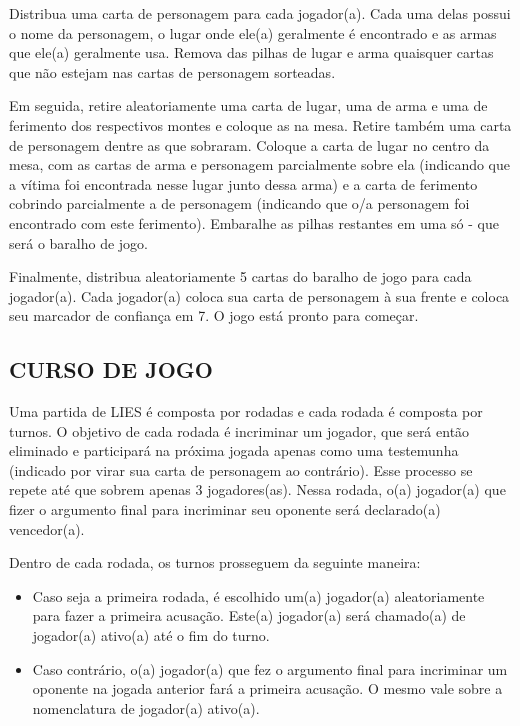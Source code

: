 \documentclass[a4paper, 11pt]{article}
\begin{document}
	Distribua uma carta de personagem para cada jogador(a). Cada uma delas possui o nome da personagem, o lugar onde ele(a) geralmente é encontrado e as armas que ele(a) geralmente usa. Remova das pilhas de lugar e arma quaisquer cartas que não estejam nas cartas de personagem sorteadas.


	Em seguida, retire aleatoriamente uma carta de lugar, uma de arma e uma de ferimento dos respectivos montes e coloque as na mesa. Retire também uma carta de personagem dentre as que sobraram. Coloque a carta de lugar no centro da mesa, com as cartas de arma e personagem parcialmente sobre ela (indicando que a vítima foi encontrada nesse lugar junto dessa arma) e a carta de ferimento cobrindo parcialmente a de personagem (indicando que o/a personagem foi encontrado com este ferimento). Embaralhe as pilhas restantes em uma só - que será o baralho de jogo.

	Finalmente, distribua aleatoriamente 5 cartas do baralho de jogo para cada jogador(a). Cada jogador(a) coloca sua carta de personagem à sua frente e coloca seu marcador de confiança em 7. O jogo está pronto para começar.

\subsection*{CURSO DE JOGO}

	Uma partida de LIES é composta por rodadas e cada rodada é composta por turnos. O objetivo de cada rodada é incriminar um jogador, que será então eliminado e participará na próxima jogada apenas como uma testemunha (indicado por virar sua carta de personagem ao contrário). Esse processo se repete até que sobrem apenas 3 jogadores(as). Nessa rodada, o(a) jogador(a) que fizer o argumento final para incriminar seu oponente será declarado(a) vencedor(a).

	Dentro de cada rodada, os turnos prosseguem da seguinte maneira:

	\begin{itemize}
		\item Caso seja a primeira rodada, é escolhido um(a) jogador(a) aleatoriamente para fazer a primeira acusação. Este(a) jogador(a) será chamado(a) de jogador(a) ativo(a) até o fim do turno.

		\item Caso contrário, o(a) jogador(a) que fez o argumento final para incriminar um oponente na jogada anterior fará a primeira acusação. O mesmo vale sobre a nomenclatura de jogador(a) ativo(a).
	\end{itemize}
\end{document}
